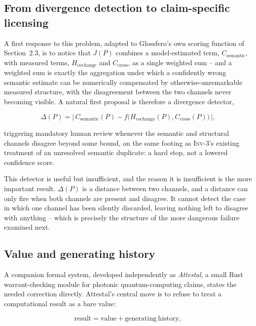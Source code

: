 \documentclass[11pt]{article}
\begin{document}
\subsection{From divergence detection to claim-specific licensing}

A first response to this problem, adapted to Glossfero's own scoring function of Section~2.3, is to notice that $J(P)$ combines a model-estimated term, $C_{\mathrm{semantic}}$, with measured terms, $H_{\mathrm{cochange}}$ and $C_{\mathrm{cross}}$, as a single weighted sum -- and a weighted sum is exactly the aggregation under which a confidently wrong semantic estimate can be numerically compensated by otherwise-unremarkable measured structure, with the disagreement between the two channels never becoming visible. A natural first proposal is therefore a divergence detector,

\begin{equation}
\Delta(P) = \bigl|\, C_{\mathrm{semantic}}(P) - f\bigl(H_{\mathrm{cochange}}(P), C_{\mathrm{cross}}(P)\bigr) \,\bigr|,
\end{equation}

triggering mandatory human review whenever the semantic and structural channels disagree beyond some bound, on the same footing as \textsc{Inv-3}'s existing treatment of an unresolved semantic duplicate: a hard stop, not a lowered confidence score.

This detector is useful but insufficient, and the reason it is insufficient is the more important result. $\Delta(P)$ is a distance between two channels, and a distance can only fire when both channels are present and disagree. It cannot detect the case in which one channel has been silently discarded, leaving nothing left to disagree with anything -- which is precisely the structure of the more dangerous failure examined next.

\subsection{Value and generating history}

A companion formal system, developed independently as \emph{Attestal}, a small Rust warrant-checking module for photonic quantum-computing claims, states the needed correction directly. Attestal's central move is to refuse to treat a computational result as a bare value:

\begin{equation}
\mathrm{result} = \mathrm{value} + \mathrm{generating\ history},
\end{equation}
\end{document}
